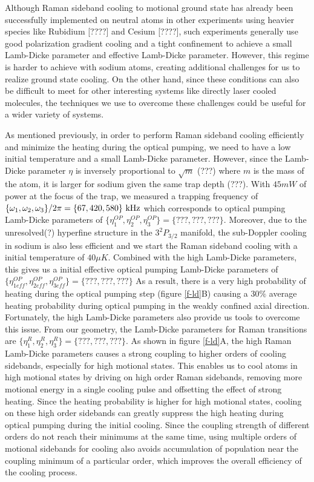 \documentclass[aps,prl,twocolumn,groupedaddress]{revtex4-1}
\begin{document}
Although Raman sideband cooling to motional ground state has already been successfully
implemented on neutral atoms in other experiments using heavier species like Rubidium [????]
and Cesium [????], such experiments generally use good polarization gradient cooling
and a tight confinement to achieve a small Lamb-Dicke parameter and effective Lamb-Dicke parameter.
However, this regime is harder to achieve with sodium atoms, creating additional challenges for
us to realize ground state cooling. On the other hand, since these conditions can also be difficult
to meet for other interesting systems like directly laser cooled molecules, the techniques we
use to overcome these challenges could be useful for a wider variety of systems.

As mentioned previously, in order to perform Raman sideband cooling efficiently and
minimize the heating during the optical pumping, we need to have a low initial temperature and
a small Lamb-Dicke parameter. However, since the Lamb-Dicke parameter $\eta$ is inversely
proportional to $\sqrt{m}$ (???) where $m$ is the mass of the atom, it is larger for sodium
given the same trap depth (???).
With $45mW$ of power at the focus of the trap, we measured a trapping frequency of
$\{\omega_1,\omega_2,\omega_3\}/2\pi = \{67, 420, 580\}\ \text{\text{kHz}}$
which corresponds to optical pumping Lamb-Dicke parameters of
$\{\eta^{OP}_1,\eta^{OP}_2,\eta^{OP}_3\} = \{???, ???, ???\}$.
Moreover, due to the unresolved(?) hyperfine structure in the $3^2P_{3/2}$ manifold,
the sub-Doppler cooling in sodium is also less efficient and we start the
Raman sideband cooling with a initial temperature of $40\mu K$. Combined with the high Lamb-Dicke
parameters, this gives us a initial effective optical pumping Lamb-Dicke parameters of
$\{\eta^{OP}_{1eff},\eta^{OP}_{2eff},\eta^{OP}_{3eff}\} = \{???, ???, ???\}$
As a result, there is a very high probability of heating during the optical pumping step
(figure \ref{f-ld}B) causing a $30\%$ average heating probability during optical pumping
in the weakly confined axial direction. Fortunately, the high Lamb-Dicke parameters also
provide us tools to overcome this issue. From our geometry, the Lamb-Dicke parameters for
Raman transitions are $\{\eta^R_{1},\eta^R_{2},\eta^R_{3}\} = \{???, ???, ???\}$. As shown in
figure \ref{f-ld}A, the high Raman Lamb-Dicke parameters causes a strong coupling to higher orders
of cooling sidebands, especially for high motional states.
This enables us to cool atoms in high motional states by driving on high order Raman sidebands,
removing more motional energy in a single cooling pulse and offsetting the effect of
strong heating. Since the heating probability is higher for high motional states,
cooling on these high order sidebands can greatly suppress the high heating during
optical pumping during the initial cooling. Since the coupling strength of different orders
do not reach their minimums at the same time, using multiple orders of motional sidebands
for cooling also avoids accumulation of population near the coupling minimum of a particular
order, which improves the overall efficiency of the cooling process.
\end{document}

